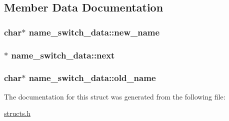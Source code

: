 \subsection{Member Data Documentation}
\hypertarget{structname__switch__data_a1678ec4303dcc6a0b0b1a23ba293cd53}{
\subsubsection[{new\-\_\-name}]{\setlength{\rightskip}{0pt plus 5cm}char$\ast$ name\-\_\-switch\-\_\-data\-::new\-\_\-name}}\label{structname__switch__data_a1678ec4303dcc6a0b0b1a23ba293cd53}
\hypertarget{structname__switch__data_aa89d7ff142ccd97fa9a68532f7d495fe}{
\subsubsection[{next}]{$\ast$ name\-\_\-switch\-\_\-data\-::next}}\label{structname__switch__data_aa89d7ff142ccd97fa9a68532f7d495fe}
\hypertarget{structname__switch__data_a23123960270351da2e88086084782da9}{
\subsubsection[{old\-\_\-name}]{\setlength{\rightskip}{0pt plus 5cm}char$\ast$ name\-\_\-switch\-\_\-data\-::old\-\_\-name}}\label{structname__switch__data_a23123960270351da2e88086084782da9}


The documentation for this struct was generated from the following file\-:\begin{DoxyCompactItemize}
\item 
\hyperlink{structs_8h}{structs.\-h}\end{DoxyCompactItemize}
